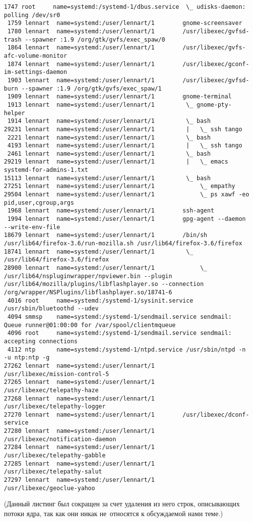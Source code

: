 \documentclass[10pt,oneside,a4paper]{article}
\begin{document}
\begin{landscape}
\begin{Verbatim}[fontsize=\small]
 1747 root     name=systemd:/systemd-1/dbus.service  \_ udisks-daemon: polling /dev/sr0
 1759 lennart  name=systemd:/user/lennart/1        gnome-screensaver
 1780 lennart  name=systemd:/user/lennart/1        /usr/libexec/gvfsd-trash --spawner :1.9 /org/gtk/gvfs/exec_spaw/0
 1864 lennart  name=systemd:/user/lennart/1        /usr/libexec/gvfs-afc-volume-monitor
 1874 lennart  name=systemd:/user/lennart/1        /usr/libexec/gconf-im-settings-daemon
 1903 lennart  name=systemd:/user/lennart/1        /usr/libexec/gvfsd-burn --spawner :1.9 /org/gtk/gvfs/exec_spaw/1
 1909 lennart  name=systemd:/user/lennart/1        gnome-terminal
 1913 lennart  name=systemd:/user/lennart/1         \_ gnome-pty-helper
 1914 lennart  name=systemd:/user/lennart/1         \_ bash
29231 lennart  name=systemd:/user/lennart/1         |   \_ ssh tango
 2221 lennart  name=systemd:/user/lennart/1         \_ bash
 4193 lennart  name=systemd:/user/lennart/1         |   \_ ssh tango
 2461 lennart  name=systemd:/user/lennart/1         \_ bash
29219 lennart  name=systemd:/user/lennart/1         |   \_ emacs systemd-for-admins-1.txt
15113 lennart  name=systemd:/user/lennart/1         \_ bash
27251 lennart  name=systemd:/user/lennart/1             \_ empathy
29504 lennart  name=systemd:/user/lennart/1             \_ ps xawf -eo pid,user,cgroup,args
 1968 lennart  name=systemd:/user/lennart/1        ssh-agent
 1994 lennart  name=systemd:/user/lennart/1        gpg-agent --daemon --write-env-file
18679 lennart  name=systemd:/user/lennart/1        /bin/sh /usr/lib64/firefox-3.6/run-mozilla.sh /usr/lib64/firefox-3.6/firefox
18741 lennart  name=systemd:/user/lennart/1         \_ /usr/lib64/firefox-3.6/firefox
28900 lennart  name=systemd:/user/lennart/1             \_ /usr/lib64/nspluginwrapper/npviewer.bin --plugin /usr/lib64/mozilla/plugins/libflashplayer.so --connection /org/wrapper/NSPlugins/libflashplayer.so/18741-6
 4016 root     name=systemd:/systemd-1/sysinit.service /usr/sbin/bluetoothd --udev
 4094 smmsp    name=systemd:/systemd-1/sendmail.service sendmail: Queue runner@01:00:00 for /var/spool/clientmqueue
 4096 root     name=systemd:/systemd-1/sendmail.service sendmail: accepting connections
 4112 ntp      name=systemd:/systemd-1/ntpd.service /usr/sbin/ntpd -n -u ntp:ntp -g
27262 lennart  name=systemd:/user/lennart/1        /usr/libexec/mission-control-5
27265 lennart  name=systemd:/user/lennart/1        /usr/libexec/telepathy-haze
27268 lennart  name=systemd:/user/lennart/1        /usr/libexec/telepathy-logger
27270 lennart  name=systemd:/user/lennart/1        /usr/libexec/dconf-service
27280 lennart  name=systemd:/user/lennart/1        /usr/libexec/notification-daemon
27284 lennart  name=systemd:/user/lennart/1        /usr/libexec/telepathy-gabble
27285 lennart  name=systemd:/user/lennart/1        /usr/libexec/telepathy-salut
27297 lennart  name=systemd:/user/lennart/1        /usr/libexec/geoclue-yahoo
\end{Verbatim}
(Данный листинг был сокращен за счет удаления из него строк, описывающих
потоки ядра, так как они никак не~относятся к обсуждаемой нами теме.)
\end{landscape}
\end{document}
